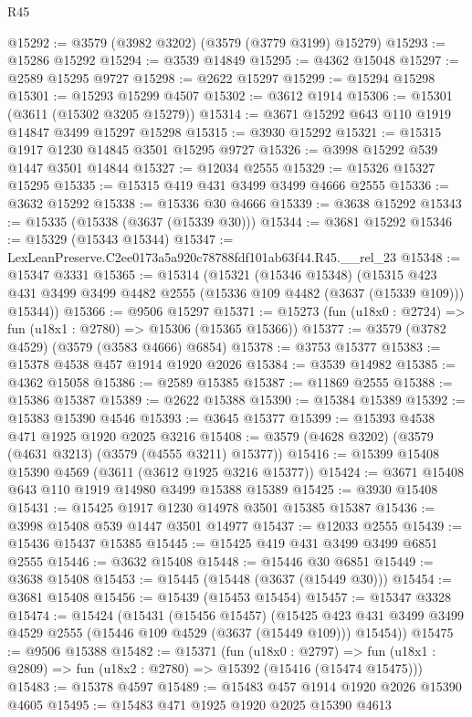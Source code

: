 \begin{lexlean}{R45}
\begin{coremodule}
@15292 := @3579 (@3982 @3202) (@3579 (@3779 @3199) @15279)
@15293 := @15286 @15292
@15294 := @3539 @14849
@15295 := @4362 @15048
@15297 := @2589 @15295 @9727
@15298 := @2622 @15297
@15299 := @15294 @15298
@15301 := @15293 @15299 @4507
@15302 := @3612 @1914
@15306 := @15301 (@3611 (@15302 @3205 @15279))
@15314 := @3671 @15292 @643 @110 @1919 @14847 @3499 @15297 @15298
@15315 := @3930 @15292
@15321 := @15315 @1917 @1230 @14845 @3501 @15295 @9727
@15326 := @3998 @15292 @539 @1447 @3501 @14844
@15327 := @12034 @2555
@15329 := @15326 @15327 @15295
@15335 := @15315 @419 @431 @3499 @3499 @4666 @2555
@15336 := @3632 @15292
@15338 := @15336 @30 @4666
@15339 := @3638 @15292
@15343 := @15335 (@15338 (@3637 (@15339 @30)))
@15344 := @3681 @15292
@15346 := @15329 (@15343 @15344)
@15347 := LexLeanPreserve.C2ee0173a5a920c78788fdf101ab63f44.R45.__rel_23
@15348 := @15347 @3331
@15365 := @15314
    (@15321
      (@15346 @15348)
      (@15315 @423 @431 @3499 @3499 @4482 @2555 (@15336 @109 @4482 (@3637 (@15339 @109))) @15344))
@15366 := @9506 @15297
@15371 := @15273 (fun (u18x0 : @2724) => fun (u18x1 : @2780) => @15306 (@15365 @15366))
@15377 := @3579 (@3782 @4529) (@3579 (@3583 @4666) @6854)
@15378 := @3753 @15377
@15383 := @15378 @4538 @457 @1914 @1920 @2026
@15384 := @3539 @14982
@15385 := @4362 @15058
@15386 := @2589 @15385
@15387 := @11869 @2555
@15388 := @15386 @15387
@15389 := @2622 @15388
@15390 := @15384 @15389
@15392 := @15383 @15390 @4546
@15393 := @3645 @15377
@15399 := @15393 @4538 @471 @1925 @1920 @2025 @3216
@15408 := @3579 (@4628 @3202) (@3579 (@4631 @3213) (@3579 (@4555 @3211) @15377))
@15416 := @15399 @15408 @15390 @4569 (@3611 (@3612 @1925 @3216 @15377))
@15424 := @3671 @15408 @643 @110 @1919 @14980 @3499 @15388 @15389
@15425 := @3930 @15408
@15431 := @15425 @1917 @1230 @14978 @3501 @15385 @15387
@15436 := @3998 @15408 @539 @1447 @3501 @14977
@15437 := @12033 @2555
@15439 := @15436 @15437 @15385
@15445 := @15425 @419 @431 @3499 @3499 @6851 @2555
@15446 := @3632 @15408
@15448 := @15446 @30 @6851
@15449 := @3638 @15408
@15453 := @15445 (@15448 (@3637 (@15449 @30)))
@15454 := @3681 @15408
@15456 := @15439 (@15453 @15454)
@15457 := @15347 @3328
@15474 := @15424
    (@15431
      (@15456 @15457)
      (@15425 @423 @431 @3499 @3499 @4529 @2555 (@15446 @109 @4529 (@3637 (@15449 @109))) @15454))
@15475 := @9506 @15388
@15482 := @15371
    (fun (u18x0 : @2797) =>
    fun (u18x1 : @2809) => fun (u18x2 : @2780) => @15392 (@15416 (@15474 @15475)))
@15483 := @15378 @4597
@15489 := @15483 @457 @1914 @1920 @2026 @15390 @4605
@15495 := @15483 @471 @1925 @1920 @2025 @15390 @4613

\end{coremodule}
\end{lexlean}
